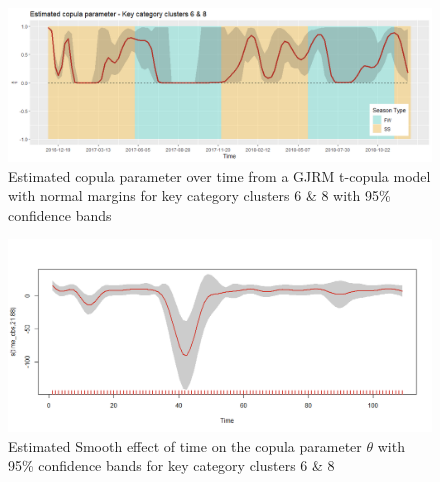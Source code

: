 \begin{figure}[H]
\centering
  \includegraphics[width=0.95\linewidth]{figures/estimated_theta_kcc_68.png}
  \caption{Estimated copula parameter over time from a \ac{GJRM} t-copula model with normal margins for key category clusters 6 \& 8 with 95\% confidence bands}
  \label{fig:estimated_theta_kcc_68}
\end{figure}




\begin{figure}[H]
\centering
  \includegraphics[width=0.95\linewidth]{figures/time_effect_on_theta_68.png}
  \caption{Estimated Smooth effect of time on the copula parameter $\theta$ with 95\% confidence bands for key category clusters 6 \& 8}
  \label{fig:time_effect_on_theta_68}
\end{figure}




















